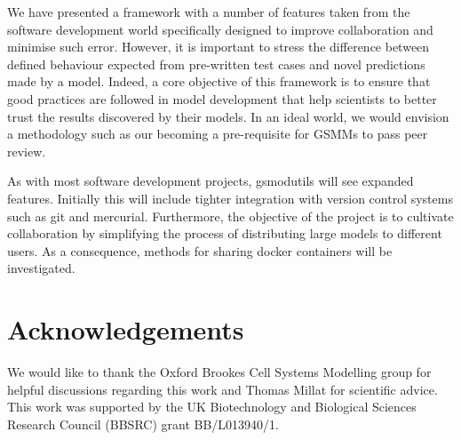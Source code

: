 \documentclass[a4paper,10pt]{article}
\begin{document}
We have presented a framework with a number of features taken from the software development world specifically designed to improve collaboration and minimise such error.
However, it is important to stress the difference between defined behaviour expected from pre-written test cases and novel predictions made by a model.
Indeed, a core objective of this framework is to ensure that good practices are followed in model development that help scientists to better trust the results discovered by their models.
In an ideal world, we would envision a methodology such as our becoming a pre-requisite for GSMMs to pass peer review.

As with most software development projects, gsmodutils will see expanded features.
Initially this will include tighter integration with version control systems such as git and mercurial.
Furthermore, the objective of the project is to cultivate collaboration by simplifying the process of distributing large models to different users.
As a consequence, methods for sharing docker containers will be investigated.

\section*{Acknowledgements}
We would like to thank the Oxford Brookes Cell Systems Modelling group for helpful discussions regarding this work and Thomas Millat for scientific advice.
This work was supported by the UK Biotechnology and Biological Sciences Research Council (BBSRC) grant BB/L013940/1.




\end{document}
